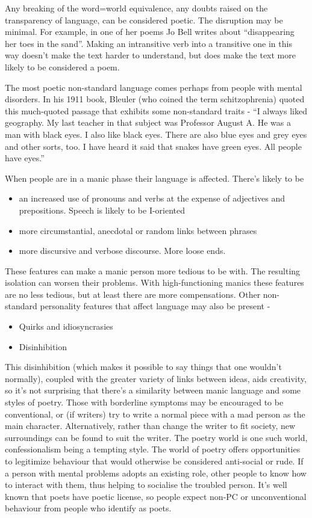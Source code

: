 \documentclass[11pt]{article}
\begin{document}
 Any breaking of the word=world equivalence, any doubts raised on the transparency of language, can be considered poetic. The disruption may be minimal. For example, in one of her poems Jo Bell writes about ``disappearing her toes in the sand''. Making an intransitive verb into a transitive one in this way doesn't make the text harder to understand, but does make the text more likely to be considered a poem.


The most poetic non-standard language comes perhaps from people with mental disorders. In his 1911 book, Bleuler (who coined the term schitzophrenia) quoted this much-quoted passage that exhibits some non-standard traits - ``I always liked geography. My last teacher in that subject was Professor August A. He was a man with black eyes. I also like black eyes. There are also blue eyes and grey eyes and other sorts, too. I have heard it said that snakes have green eyes. All people have eyes.''


When people are in a manic phase their language is affected. There's likely to be
\begin{itemize}
\item an increased use of pronouns and verbs at the expense of adjectives and prepositions. Speech is likely to be I-oriented
\item more circumstantial, anecdotal or random links between phrases
\item more discursive and verbose discourse. More loose ends.
\end{itemize}

These features can make a manic person more tedious to be with. The resulting isolation can worsen their problems. With high-functioning manics these features are no less tedious, but at least there are more compensations. Other non-standard personality features that affect language may also be present -
\begin{itemize}
\item Quirks and idiosyncrasies
\item Disinhibition
\end{itemize}


This disinhibition (which makes it possible to say things that one wouldn't normally), coupled with the greater variety of links between ideas, aids creativity, so it's not surprising that there's a similarity between manic language and some styles of poetry. Those with borderline symptoms may be encouraged to be conventional, or (if writers) try to write a normal piece with a mad person as the main character. Alternatively, rather than change the writer to fit society, new surroundings can be found to suit the writer. The poetry world is one such world, confessionalism being a tempting style. The world of poetry offers opportunities to legitimize behaviour that would otherwise be considered anti-social or rude. If a person with mental problems adopts an existing role, other people to know how to interact with them, thus helping to socialise the troubled person. It's well known that poets have poetic license, so people expect non-PC or unconventional behaviour from people who identify as poets.
\end{document}
